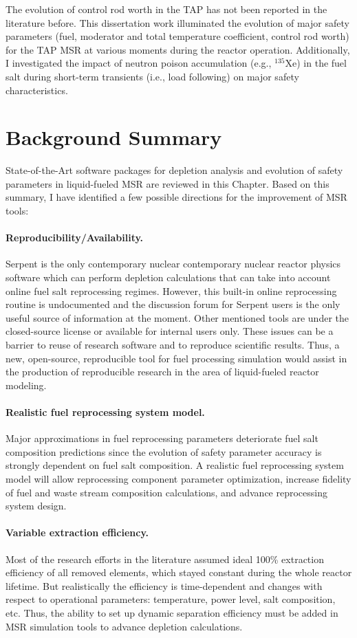 The evolution of control rod worth in the \gls{TAP} has not been reported in 
the literature before. This dissertation work illuminated the evolution of  
major safety parameters (fuel, moderator and total temperature coefficient, 
control rod worth) for the \gls{TAP} \gls{MSR} at various moments during the 
reactor operation. Additionally, I investigated the impact of neutron poison 
accumulation (e.g., $^{135}$Xe) in the fuel salt during short-term transients 
(i.e., load following) on major safety characteristics.


\section{Background Summary}
State-of-the-Art software packages for depletion analysis and evolution of 
safety parameters in liquid-fueled \gls{MSR} are reviewed in this Chapter. 
Based on this summary, I have identified a few possible directions for 
the improvement of \gls{MSR} tools:
\paragraph{Reproducibility/Availability.}
Serpent is the only contemporary nuclear 
contemporary nuclear 
reactor physics software which can perform depletion calculations that can 
take 
into account online fuel salt reprocessing regimes. However, this built-in 
online reprocessing routine is undocumented  and the discussion forum for 
Serpent users is the only useful source of information at the moment. 
Other mentioned tools are under the closed-source license or available for 
internal users only. These issues can be a barrier to reuse of research 
software and to reproduce scientific results. Thus, a new, open-source, 
reproducible tool for fuel processing simulation would assist in the 
production of reproducible research in the area of liquid-fueled reactor 
modeling.
\paragraph{Realistic fuel reprocessing system model.} 
Major approximations in fuel reprocessing parameters deteriorate fuel salt 
composition predictions since the evolution of safety parameter accuracy is 
strongly dependent on fuel salt composition. A realistic fuel reprocessing 
system model will allow reprocessing component parameter optimization,  
increase fidelity of fuel and waste stream composition calculations, and 
advance reprocessing system design.
\paragraph{Variable extraction efficiency.} Most of the research efforts in 
the literature assumed ideal 100\% extraction efficiency of all removed 
elements, which stayed 
constant during the whole reactor lifetime. But realistically the efficiency 
is time-dependent and changes with respect to operational parameters: 
temperature, power level, salt composition, etc. Thus, the ability to set up 
dynamic separation efficiency must be added in \gls{MSR} simulation tools to 
advance depletion calculations.
